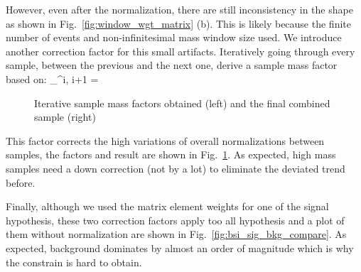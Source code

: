 However, even after the normalization, there are still inconsistency in the shape as shown
in Fig.~\ref{fig:window_wgt_matrix} (b). This is likely because the finite number of events
and non-infinitesimal mass window size used. We introduce another correction factor for
this small artifacts. Iteratively going through every sample, between the previous and the
next one, derive a sample mass factor based on:
\be
{}_^{i, i+1} = 
\ee

\begin{figure}[htb]
\begin{center}
\end{center}
\caption{Iterative sample mass factors obtained (left) and the final combined sample (right)}
\label{fig:LHE_rewgt}
\end{figure}

This factor corrects the high variations of overall normalizations between samples, the factors and result
are shown in Fig.~\ref{fig:LHE_rewgt}. As expected, high mass samples need a down correction (not by a lot)
to eliminate the deviated trend before.

Finally, although we used the matrix element weights for one of the signal hypothesis, these two
correction factors apply too all hypothesis and a plot of them without normalization are shown
in Fig.~\ref{fig:bsi_sig_bkg_compare}. As expected, background dominates by almost an order of
magnitude which is why the constrain is hard to obtain.

